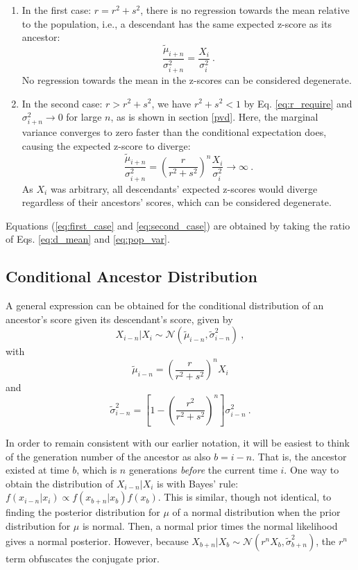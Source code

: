 \documentclass{svproc} %
\begin{document}
\begin{enumerate}
\item In the first case: $r = r^2 + s^2$, there is no regression towards the mean relative to the population, i.e., a descendant has the same expected z-score as its ancestor:
\begin{equation}
\frac{\tilde{\mu}_{i+n}}{\sigma_{i+n}^2} = \frac{X_i}{\sigma_i^2} \ .
\label{eq:first_case}
\end{equation}
No regression towards the mean in the z-scores can be considered degenerate.
\item In the second case: $r > r^2 + s^2$, we have $r^2 + s^2 < 1$ by Eq. \ref{eq:r_require} and $\sigma_{i+n}^2 \rightarrow 0$ for large $n$, as is shown in section \ref{pvd}. Here, the marginal variance converges to zero faster than the conditional expectation does, causing the expected z-score to diverge:
\begin{equation}
\frac{\tilde{\mu}_{i+n}}{\sigma_{i+n}^2} = (\frac{r}{r^2+s^2})^n \frac{X_i}{\sigma_i^2} \rightarrow \infty \ .
\label{eq:second_case}
\end{equation}
As $X_i$ was arbitrary, all descendants' expected z-scores would diverge regardless of their ancestors' scores, which can be considered degenerate. 
\end{enumerate}
Equations (\ref{eq:first_case} and \ref{eq:second_case}) are obtained by taking the ratio of Eqs. \ref{eq:d_mean} and \ref{eq:pop_var}.


\subsection{Conditional Ancestor Distribution} \label{cad}

A general expression can be obtained for the conditional distribution of an ancestor's score given its descendant's score, given by
\begin{equation}
X_{i-n}|X_i \sim \mathcal{N}( \tilde{\mu}_{i-n}, \tilde{\sigma}_{i-n}^2) \ ,
\label{eq:a_dist}
\end{equation}
with
\begin{equation}
\tilde{\mu}_{i-n} = (\frac{r}{r^2+s^2})^n X_i
\label{eq:a_mean}
\end{equation}
and
\begin{equation}
\tilde{\sigma}_{i-n}^2 = [1 - (\frac{r^2}{r^2+s^2})^n] \sigma_{i-n}^2 \ .
\label{eq:a_var}
\end{equation}

In order to remain consistent with our earlier notation, it will be easiest to think of the generation number of the ancestor as also $b = i - n$. That is, the ancestor existed at time $b$, which is $n$ generations \emph{before} the current time $i$. One way to obtain the distribution of $X_{i-n}|X_i$ is with Bayes' rule: $f(x_{i-n}|x_i) \propto f(x_{b+n}|x_b) f(x_b)$. 
This is similar, though not identical, to finding the posterior distribution for $\mu$ of a normal distribution when the prior distribution for $\mu$ is normal. Then, a normal prior times the normal likelihood gives a normal posterior. However, because $X_{b+n}|X_b \sim \mathcal{N}(r^n X_b, \tilde{\sigma}_{b+n}^2)$, the $r^n$ term obfuscates the conjugate prior.
\end{document}
